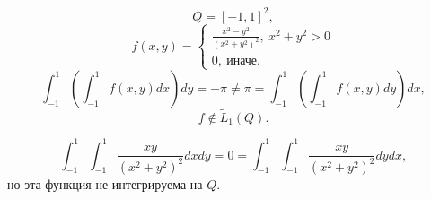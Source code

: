 \begin{example}
    \[Q = [-1,1]^2,\]
    \[f(x,y) = 
    \begin{cases}
        \frac{x^2-y^2}{(x^2+y^2)^2}, \ x^2+y^2>0 \\
        0, \ \text{иначе}.
    \end{cases}
    \]
    \[\int_{-1}^1 \left(\int_{-1}^1 f(x,y)dx\right)dy = -\pi \neq \pi = \int_{-1}^1 \left(\int_{-1}^1 f(x,y)dy\right)dx,\]
    \[f \notin \widetilde{L}_1(Q).\]
\end{example}

\begin{example}
    \[\int_{-1}^1 \int_{-1}^1 \frac{xy}{(x^2+y^2)^2} dxdy = 0 = \int_{-1}^1 \int_{-1}^1 \frac{xy}{(x^2+y^2)^2}dydx,\]
    но эта функция не интегрируема на $Q$.
\end{example}

